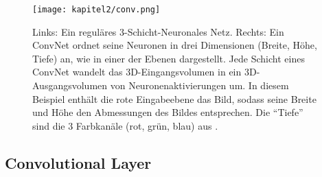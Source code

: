   \begin{figure}[H]
    \centering
    \texttt{[image: kapitel2/conv.png]}
    \caption[Vergleich eines NN mit einem CNN]{Links: Ein reguläres 3-Schicht-Neuronales Netz. Rechts: Ein ConvNet ordnet seine Neuronen in drei Dimensionen (Breite, Höhe, Tiefe) an, wie in einer der Ebenen dargestellt. Jede Schicht eines ConvNet wandelt das 3D-Eingangsvolumen in ein 3D-Ausgangsvolumen von Neuronenaktivierungen um. In diesem Beispiel enthält die rote Eingabeebene das Bild, sodass seine Breite und Höhe den Abmessungen des Bildes entsprechen. Die \enquote{Tiefe} sind die 3 Farbkanäle (rot, grün, blau) aus \cite*{StanfordUniversityCoursecs231n2018a}.}
    \label{Kap2:Conv}
  \end{figure}



  \subsection{Convolutional Layer}

